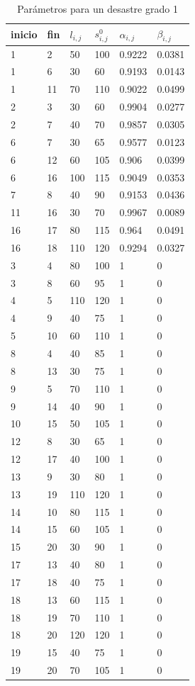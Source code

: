 \begin{table}[H]
\centering
\begin{tabular}{|l|l|l|l|l|l|}
\hline
inicio & fin & $l_{i,j}$ & $s_{i,j}^0$ & $\alpha_{i,j}$ & $\beta_{i,j}$ \\ \hline
1 & 2 & 50 & 100 & 0.9222 & 0.0381 \\ \hline
1 & 6 & 30 & 60 & 0.9193 & 0.0143 \\ \hline
1 & 11 & 70 & 110 & 0.9022 & 0.0499 \\ \hline
2 & 3 & 30 & 60 & 0.9904 & 0.0277 \\ \hline
2 & 7 & 40 & 70 & 0.9857 & 0.0305 \\ \hline
6 & 7 & 30 & 65 & 0.9577 & 0.0123 \\ \hline
6 & 12 & 60 & 105 & 0.906 & 0.0399 \\ \hline
6 & 16 & 100 & 115 & 0.9049 & 0.0353 \\ \hline
7 & 8 & 40 & 90 & 0.9153 & 0.0436 \\ \hline
11 & 16 & 30 & 70 & 0.9967 & 0.0089 \\ \hline
16 & 17 & 80 & 115 & 0.964 & 0.0491 \\ \hline
16 & 18 & 110 & 120 & 0.9294 & 0.0327 \\ \hline
3 & 4 & 80 & 100 & 1 & 0 \\ \hline
3 & 8 & 60 & 95 & 1 & 0 \\ \hline
4 & 5 & 110 & 120 & 1 & 0 \\ \hline
4 & 9 & 40 & 75 & 1 & 0 \\ \hline
5 & 10 & 60 & 110 & 1 & 0 \\ \hline
8 & 4 & 40 & 85 & 1 & 0 \\ \hline
8 & 13 & 30 & 75 & 1 & 0 \\ \hline
9 & 5 & 70 & 110 & 1 & 0 \\ \hline
9 & 14 & 40 & 90 & 1 & 0 \\ \hline
10 & 15 & 50 & 105 & 1 & 0 \\ \hline
12 & 8 & 30 & 65 & 1 & 0 \\ \hline
12 & 17 & 40 & 100 & 1 & 0 \\ \hline
13 & 9 & 30 & 80 & 1 & 0 \\ \hline
13 & 19 & 110 & 120 & 1 & 0 \\ \hline
14 & 10 & 80 & 115 & 1 & 0 \\ \hline
14 & 15 & 60 & 105 & 1 & 0 \\ \hline
15 & 20 & 30 & 90 & 1 & 0 \\ \hline
17 & 13 & 40 & 80 & 1 & 0 \\ \hline
17 & 18 & 40 & 75 & 1 & 0 \\ \hline
18 & 13 & 60 & 115 & 1 & 0 \\ \hline
18 & 19 & 70 & 110 & 1 & 0 \\ \hline
18 & 20 & 120 & 120 & 1 & 0 \\ \hline
19 & 15 & 40 & 75 & 1 & 0 \\ \hline
19 & 20 & 70 & 105 & 1 & 0 \\ \hline

\end{tabular}
\caption{Parámetros para un desastre grado 1}
\label{grade1}
\end{table}


